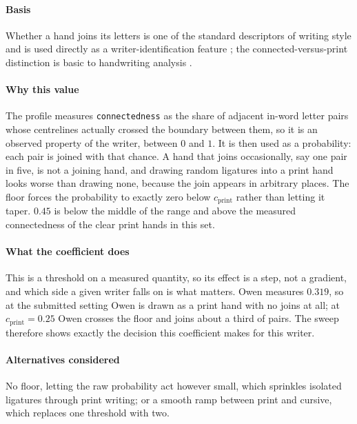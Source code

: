 \paragraph{Basis}

Whether a hand joins its letters is one of the standard descriptors of writing style and is used directly as a writer-identification feature \cite{bulacu2007}; the connected-versus-print distinction is basic to handwriting analysis \cite{plamondon2000}.

\paragraph{Why this value}

The profile measures \texttt{connectedness} as the share of adjacent in-word letter pairs whose centrelines actually crossed the boundary between them, so it is an observed property of the writer, between $0$ and $1$. It is then used as a probability: each pair is joined with that chance. A hand that joins occasionally, say one pair in five, is not a joining hand, and drawing random ligatures into a print hand looks worse than drawing none, because the join appears in arbitrary places. The floor forces the probability to exactly zero below $c_{\text{print}}$ rather than letting it taper. $0.45$ is below the middle of the range and above the measured connectedness of the clear print hands in this set.

\paragraph{What the coefficient does}

This is a threshold on a measured quantity, so its effect is a step, not a gradient, and which side a given writer falls on is what matters. Owen measures $0.319$, so at the submitted setting Owen is drawn as a print hand with no joins at all; at $c_{\text{print}} = 0.25$ Owen crosses the floor and joins about a third of pairs. The sweep therefore shows exactly the decision this coefficient makes for this writer.

\paragraph{Alternatives considered}

No floor, letting the raw probability act however small, which sprinkles isolated ligatures through print writing; or a smooth ramp between print and cursive, which replaces one threshold with two.

